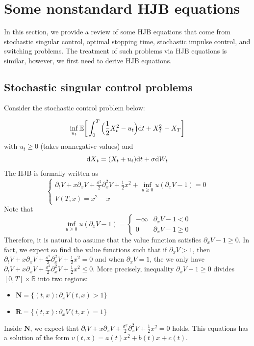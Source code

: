 \documentclass[11pt]{book}
\newcommand{\dt}{\text{\normalfont d}t}
\newcommand{\dX}{\text{\normalfont d}X}
\newcommand{\dW}{\text{\normalfont d}W}
\begin{document}
\section{Some nonstandard HJB equations}
In this section, we provide a review of some HJB equations that come from stochastic singular control, optimal stopping time, stochastic impulse control, and switching problems. The treatment of such problems via HJB equations is similar, however, we first need to derive HJB equations. 
\subsection{Stochastic singular control problems}
Consider the stochastic control problem below:
\begin{eg}
    \begin{equation}
        \inf_{u_t}\mathbb{E}\bigg[\int_0^T\Big(\frac12 X_t^2 - u_t\Big){\dt}+ X_T^2- X_T\bigg]
    \end{equation}
    with $u_t\ge0$ (takes nonnegative values) and 
    \begin{equation}
        {\dX}_t=(X_t+u_t){{\dt}}+\sigma \dW_t
    \end{equation}
    The HJB  is formally written as 
    \begin{equation}
        \begin{cases}
            \partial_t V + x\partial_x V + \frac{\sigma^2}{2}\partial^2_{x} V + \frac12x^2 + \inf_{u\ge0} u(\partial_x V-1)=0\\
            V(T,x)=x^2-x
        \end{cases}
    \end{equation}
    Note that 
    \begin{equation}
        \inf_{u\ge0} u(\partial_x V-1)=
        \begin{cases}
            -\infty & \partial_x V-1<0\\
            0 & \partial_x V-1\ge0
        \end{cases}
    \end{equation}
    Therefore, it is natural to assume that the value function satisfies $\partial_x V-1\ge0$. In fact, we expect so find the value functions such that if $\partial_x V>1$, then $\partial_t V + x\partial_x V + \frac{\sigma^2}{2}\partial^2_{x} V + \frac12x^2=0$ and when $\partial_x V=1$, the we only have $\partial_t V + x\partial_x V + \frac{\sigma^2}{2}\partial^2_{x} V + \frac12x^2\le 0$. More precisely, inequality $\partial_x V-1\ge0$ divides $[0,T]\times\mathbb{R}$ into two regions: 
    \begin{itemize}
        \item $\mathbf{N} = \{(t,x): \partial_x V(t,x)>1\}$
        \item $\mathbf{R} = \{(t,x): \partial_x V(t,x)=1\}$
    \end{itemize}
Inside $\mathbf{N}$, we expect that $\partial_t V + x\partial_x V + \frac{\sigma^2}{2}\partial^2_{x} V + \frac12x^2=0$ holds. This equations has a solution of the form $v(t,x)=a(t)x^2+b(t)x+c(t)$. 


\end{eg}
\end{document}

